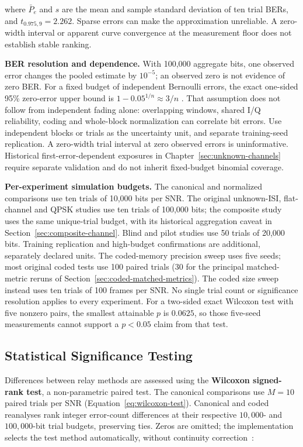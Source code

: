 where $\bar P_e$ and $s$ are the mean and sample standard deviation of ten trial BERs, and $t_{0.975,9}=2.262$. Sparse errors can make the approximation unreliable. A zero-width interval or apparent curve convergence at the measurement floor does not establish stable ranking.

\textbf{BER resolution and dependence.} With 100{,}000 aggregate bits, one observed error changes the pooled estimate by $10^{-5}$; an observed zero is not evidence of zero BER. For a fixed budget of independent Bernoulli errors, the exact one-sided 95\% zero-error upper bound is $1-0.05^{1/n}\approx3/n$ \cite{HanleyLippmanHand1983ZeroNumerators}. That assumption does not follow from independent fading alone: overlapping windows, shared I/Q reliability, coding and whole-block normalization can correlate bit errors. Use independent blocks or trials as the uncertainty unit, and separate training-seed replication. A zero-width trial interval at zero observed errors is uninformative. Historical first-error-dependent exposures in Chapter~\ref{sec:unknown-channels} require separate validation and do not inherit fixed-budget binomial coverage.

\textbf{Per-experiment simulation budgets.} The canonical and normalized comparisons use ten trials of 10{,}000 bits per SNR. The original unknown-ISI, flat-channel and QPSK studies use ten trials of 100{,}000 bits; the composite study uses the same unique-trial budget, with its historical aggregation caveat in Section~\ref{sec:composite-channel}. Blind and pilot studies use 50 trials of 20{,}000 bits. Training replication and high-budget confirmations are additional, separately declared units. The coded-memory precision sweep uses five seeds; most original coded tests use 100 paired trials (30 for the principal matched-metric reruns of Section~\ref{sec:coded-matched-metrics}). The coded size sweep instead uses ten trials of 100 frames per SNR. No single trial count or significance resolution applies to every experiment. For a two-sided exact Wilcoxon test with five nonzero pairs, the smallest attainable $p$ is $0.0625$, so those five-seed measurements cannot support a $p<0.05$ claim from that test.

\subsection{Statistical Significance Testing}\label{sec:statistical-significance-testing}

Differences between relay methods are assessed using the \textbf{Wilcoxon signed-rank test}, a non-parametric paired test. The canonical comparisons use \(M = 10\) paired trials per SNR (Equation~\ref{eq:wilcoxon-test}). Canonical and coded reanalyses rank integer error-count differences at their respective $10{,}000$- and $100{,}000$-bit trial budgets, preserving ties. Zeros are omitted; the implementation selects the test method automatically, without continuity correction~:

